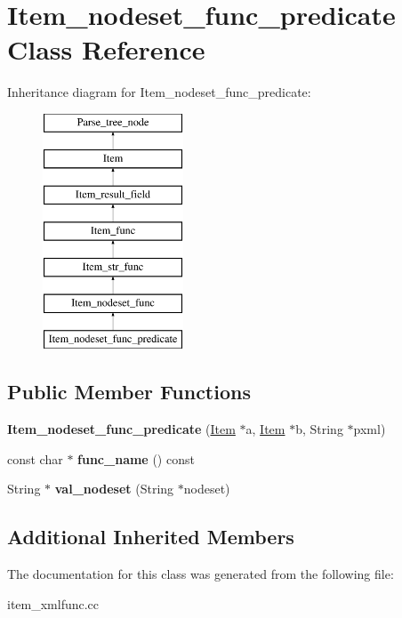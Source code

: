 \hypertarget{classItem__nodeset__func__predicate}{}\section{Item\+\_\+nodeset\+\_\+func\+\_\+predicate Class Reference}
\label{classItem__nodeset__func__predicate}
Inheritance diagram for Item\+\_\+nodeset\+\_\+func\+\_\+predicate\+:\begin{figure}[H]
\begin{center}
\leavevmode
\includegraphics[height=7.000000cm]{classItem__nodeset__func__predicate}
\end{center}
\end{figure}
\subsection*{Public Member Functions}
\begin{DoxyCompactItemize}
\item 
\mbox{\label{classItem__nodeset__func__predicate_ae595a6feddc87e38410238ddc710901c}} 
{\bfseries Item\+\_\+nodeset\+\_\+func\+\_\+predicate} (\mbox{\hyperlink{classItem}{Item}} $\ast$a, \mbox{\hyperlink{classItem}{Item}} $\ast$b, String $\ast$pxml)
\item 
\mbox{\label{classItem__nodeset__func__predicate_a59a7ebb521a75717f131e0e3ff8a3788}} 
const char $\ast$ {\bfseries func\+\_\+name} () const
\item 
\mbox{\label{classItem__nodeset__func__predicate_a797dcf5eb7a3eb740b5c03aa98facfef}} 
String $\ast$ {\bfseries val\+\_\+nodeset} (String $\ast$nodeset)
\end{DoxyCompactItemize}
\subsection*{Additional Inherited Members}


The documentation for this class was generated from the following file\+:\begin{DoxyCompactItemize}
\item 
item\+\_\+xmlfunc.\+cc\end{DoxyCompactItemize}
